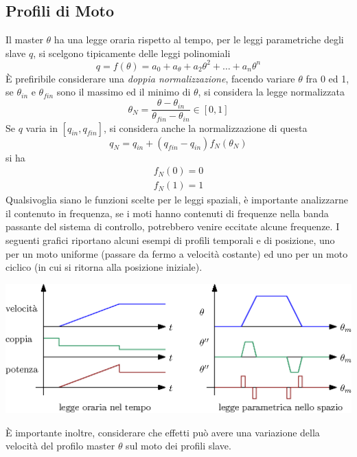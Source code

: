 \documentclass[10pt, letterpaper]{report}
\begin{document}
\subsection{Profili di Moto}
Il master $\theta$ ha una legge oraria rispetto al tempo, per le leggi parametriche degli slave $q$, si scelgono tipicamente delle leggi polinomiali 
$$q=f(\theta)=a_0+a_\theta+a_2\theta^2+\dots + a_n\theta^n $$
È prefiribile considerare una \textit{doppia normalizzazione}, facendo variare $\theta$ fra 0 ed 1, se $\theta_{in}$ e $\theta_{fin}$ sono il massimo ed il minimo di $\theta$, si considera la legge normalizzata 
$$ \theta_N = \frac{\theta - \theta_{in}}{\theta_{fin}-\theta_{in}}\in [0,1]$$
Se $q$ varia in $[q_{in},q_{fin}]$, si considera anche la normalizzazione di questa 
$$ q_N=q_{in}+(q_{fin}-q_{in})f_N(\theta_N)$$
si ha 
$$\begin{matrix}
    f_N(0)=0\\ f_N(1)=1
\end{matrix} $$
Qualsivoglia siano le funzioni scelte per le leggi spaziali, è importante analizzarne il contenuto in frequenza, se i moti hanno contenuti di frequenze nella banda passante del sistema di controllo, potrebbero venire eccitate alcune frequenze. \acc 
I seguenti grafici riportano alcuni esempi di profili temporali e di posizione, uno per un moto uniforme (passare da fermo a velocità costante) ed uno per un moto ciclico (in cui si ritorna alla posizione iniziale).
\begin{center}
    \includegraphics[width=\textwidth]{images/profiliMoti.eps }
\end{center}
È importante inoltre, considerare che effetti può avere una variazione della velocità del profilo master $\theta$ sul moto dei profili slave. 
\end{document}
